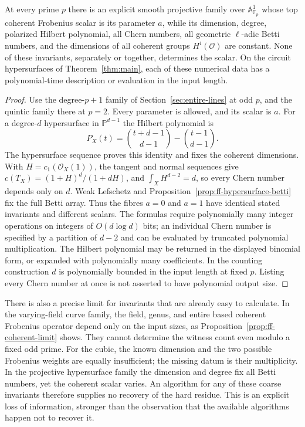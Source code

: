 \begin{proposition}\label{prop:coarse-invariant-collision}
At every prime $p$ there is an explicit smooth projective family over $\mathbb A^1_{\mathbb F_p}$ whose top coherent Frobenius scalar is its parameter $a$, while its dimension, degree, polarized Hilbert polynomial, all Chern numbers, all geometric $\ell$-adic Betti numbers, and the dimensions of all coherent groups $H^i(\mathcal O)$ are constant. None of these invariants, separately or together, determines the scalar. On the circuit hypersurfaces of Theorem~\ref{thm:main}, each of these numerical data has a polynomial-time description or evaluation in the input length.
\end{proposition}
\begin{proof}
Use the degree-$p+1$ family of Section~\ref{sec:entire-lines} at odd $p$, and the quintic family there at $p=2$. Every parameter is allowed, and its scalar is $a$. For a degree-$d$ hypersurface in $\mathbb P^{d-1}$ the Hilbert polynomial is
\[
 P_X(t)=\binom{t+d-1}{d-1}-\binom{t-1}{d-1}.
\]
The hypersurface sequence proves this identity and fixes the coherent dimensions. With $H=c_1(\mathcal O_X(1))$, the tangent and normal sequences give $c(T_X)=(1+H)^d/(1+dH)$, and $\int_XH^{d-2}=d$, so every Chern number depends only on $d$. Weak Lefschetz and Proposition~\ref{prop:ff-hypersurface-betti} fix the full Betti array. Thus the fibres $a=0$ and $a=1$ have identical stated invariants and different scalars. The formulas require polynomially many integer operations on integers of $O(d\log d)$ bits; an individual Chern number is specified by a partition of $d-2$ and can be evaluated by truncated polynomial multiplication. The Hilbert polynomial may be returned in the displayed binomial form, or expanded with polynomially many coefficients. In the counting construction $d$ is polynomially bounded in the input length at fixed $p$. Listing every Chern number at once is not asserted to have polynomial output size.
\end{proof}

There is also a precise limit for invariants that are already easy to calculate. In the varying-field curve family, the field, genus, and entire based coherent Frobenius operator depend only on the input sizes, as Proposition~\ref{prop:ff-coherent-limit} shows. They cannot determine the witness count even modulo a fixed odd prime. For the cubic, the known dimension and the two possible Frobenius weights are equally insufficient; the missing datum is their multiplicity. In the projective hypersurface family the dimension and degree fix all Betti numbers, yet the coherent scalar varies. An algorithm for any of these coarse invariants therefore supplies no recovery of the hard residue. This is an explicit loss of information, stronger than the observation that the available algorithms happen not to recover it.
